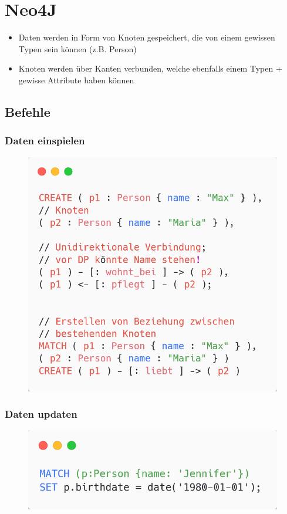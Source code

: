 \section{Neo4J}

\begin{itemize}
    \item Daten werden in Form von Knoten gespeichert, die von einem gewissen Typen sein können (z.B. Person)
    \item Knoten werden über Kanten verbunden, welche ebenfalls einem Typen + gewisse Attribute haben können
\end{itemize}
\subsection{Befehle}
\subsubsection{Daten einspielen}
\begin{figure}[H]
    \centering
    \includegraphics[scale=.2]{res/themenkorb_8/cypher_insert.png}
\end{figure}
\subsubsection{Daten updaten}
\begin{figure}[H]
    \centering
    \includegraphics[scale=.3]{res/themenkorb_8/cypher_update.png}
\end{figure}

